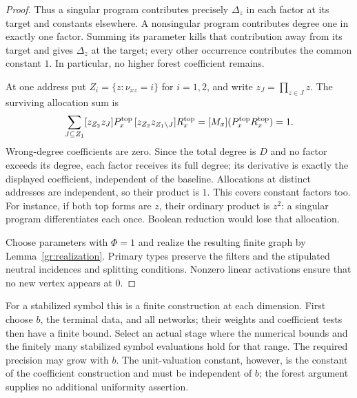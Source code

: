\begin{proof}
Thus a singular program contributes precisely $\Delta_z$ in each factor
at its target and constants elsewhere.  A nonsingular program contributes
degree one in exactly one factor.  Summing its parameter kills that
contribution away from its target and gives $\Delta_z$ at the target;
every other occurrence contributes the common constant $1$.  In
particular, no higher forest coefficient remains.

At one address put $Z_i=\{z:\nu_{xz}=i\}$ for $i=1,2$, and write
$z_J=\prod_{z\in J}z$.  The surviving allocation sum is
\[
 \sum_{J\subseteq Z_1}
 [z_{Z_2}z_J]P_x^{\rm top}\,
 [z_{Z_2}z_{Z_1\setminus J}]R_x^{\rm top}
   =[M_x](P_x^{\rm top}R_x^{\rm top})=1.
\]
Wrong-degree coefficients are zero.  Since the total degree is $D$
and no factor exceeds its degree, each factor receives its full degree;
its derivative is exactly the displayed coefficient, independent of the
baseline.  Allocations at distinct addresses are independent, so their
product is $1$.  This covers constant factors too.  For instance, if
both top forms are $z$, their ordinary product is $z^2$: a singular
program differentiates each once.  Boolean reduction would lose that
allocation.

Choose parameters with $\Phi=1$ and realize the resulting finite graph
by Lemma~\ref{gr:realization}.  Primary types preserve the filters and
the stipulated neutral incidences and splitting conditions.  Nonzero
linear activations ensure that no new vertex appears at $0$.
\end{proof}

For a stabilized symbol this is a finite construction at each dimension.
First choose $b$, the terminal data, and all networks; their weights and
coefficient tests then have a finite bound.  Select an actual stage where the numerical bounds and the finitely many stabilized symbol
evaluations hold for that range.  The required precision may
grow with $b$.  The unit-valuation constant, however, is the constant of
the coefficient construction and must be independent of $b$; the forest
argument supplies no additional uniformity assertion.
